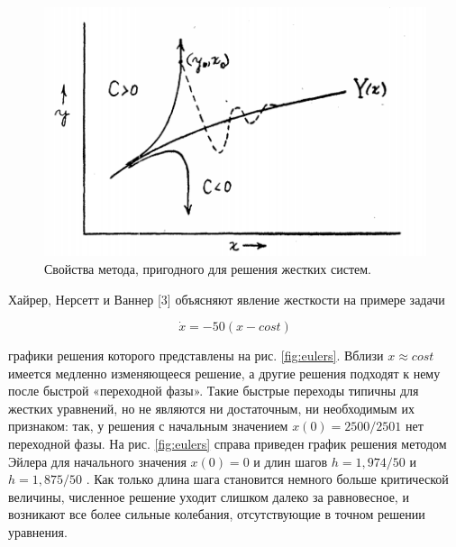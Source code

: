 \documentclass[12pt,a4paper]{book}
\begin{document}
 \setcounter{figure}{6}
\begin{figure}[h!]
 	\centering
 	\includegraphics[width=0.7\linewidth]{photo/method_prop}
 	\caption{Свойства метода, пригодного для решения жестких систем.}
 	\label{fig:methodprop}
\end{figure}
\newpage
 
Хайрер, Нерсетт и Ваннер [3] объясняют явление жесткости на примере задачи

\setcounter{equation}{31}
\begin{equation}
\dot{x} = -50(x-cost)
\label{for}
\end{equation}

графики решения которого представлены на рис. \ref{fig:eulers}.  Вблизи $ x \approx cost $  имеется медленно изменяющееся решение, а другие решения подходят к нему после быстрой «переходной фазы». Такие быстрые переходы типичны для жестких уравнений, но не являются ни достаточным, ни необходимым их признаком: так, у решения с начальным значением $ x(0) = 2500/2501 $  нет переходной фазы. На рис. \ref{fig:eulers} справа приведен график решения методом Эйлера для начального значения $ x(0) = 0 $  и длин шагов $ h = 1,974/50 $  и $ h = 1,875/50 $ . Как только длина шага становится немного больше критической величины, численное решение уходит слишком далеко за равновесное, и возникают все более сильные колебания, отсутствующие в точном решении уравнения.
\end{document}
